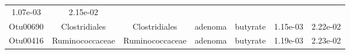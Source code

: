 \documentclass[11pt,]{article}
\begin{document}
\begin{longtable}[]{@{}ccccccc@{}}
\begin{minipage}[t]{0.09\columnwidth}
1.07e-03\strut
\end{minipage} & \begin{minipage}[t]{0.09\columnwidth}\centering\strut
2.15e-02\strut
\end{minipage}\tabularnewline
\begin{minipage}[t]{0.09\columnwidth}\centering\strut
Otu00690\strut
\end{minipage} & \begin{minipage}[t]{0.17\columnwidth}\centering\strut
Clostridiales\strut
\end{minipage} & \begin{minipage}[t]{0.17\columnwidth}\centering\strut
Clostridiales\strut
\end{minipage} & \begin{minipage}[t]{0.09\columnwidth}\centering\strut
adenoma\strut
\end{minipage} & \begin{minipage}[t]{0.11\columnwidth}\centering\strut
butyrate\strut
\end{minipage} & \begin{minipage}[t]{0.09\columnwidth}\centering\strut
1.15e-03\strut
\end{minipage} & \begin{minipage}[t]{0.09\columnwidth}\centering\strut
2.22e-02\strut
\end{minipage}\tabularnewline
\begin{minipage}[t]{0.09\columnwidth}\centering\strut
Otu00416\strut
\end{minipage} & \begin{minipage}[t]{0.17\columnwidth}\centering\strut
Ruminococcaceae\strut
\end{minipage} & \begin{minipage}[t]{0.17\columnwidth}\centering\strut
Ruminococcaceae\strut
\end{minipage} & \begin{minipage}[t]{0.09\columnwidth}\centering\strut
adenoma\strut
\end{minipage} & \begin{minipage}[t]{0.11\columnwidth}\centering\strut
butyrate\strut
\end{minipage} & \begin{minipage}[t]{0.09\columnwidth}\centering\strut
1.19e-03\strut
\end{minipage} & \begin{minipage}[t]{0.09\columnwidth}\centering\strut
2.23e-02\strut
\end{minipage}\tabularnewline

\end{longtable}
\end{document}
